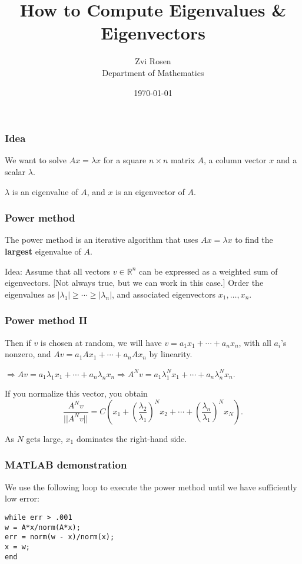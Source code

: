\documentclass[12pt]{beamer}
\newcommand{\RR}{\ensuremath{\mathbb{R}}}
\theoremstyle{definition}
\begin{document}
\author[Z. Rosen]{Zvi Rosen \\ Department of Mathematics}

\date[\today]{\today}
\title[Eigenvalue Algorithms]{{\Large How to Compute 
Eigenvalues \& Eigenvectors}}


\frame{\titlepage}


\begin{frame}
\frametitle{Idea}
We want to solve $Ax = \lambda x$ for a square $n \times n$ matrix $A$,
a column vector $x$ and a scalar $\lambda$.

$\lambda$ is an eigenvalue of $A$, and $x$ is an eigenvector of $A$.
\end{frame}

\begin{frame}
\frametitle{Power method}

The power method is an iterative algorithm that uses $Ax =  \lambda x$ to
find the {\bf largest} eigenvalue of $A$.

Idea: Assume that all vectors $v \in \RR^n$ can be expressed as
a weighted sum of eigenvectors. [Not always true, but we can work in this
case.] Order the eigenvalues as $|\lambda_1| \geq \cdots \geq |\lambda_n|$, and
associated eigenvectors $x_1,\ldots,x_n$.

\end{frame}

\begin{frame}

\frametitle{Power method II}
Then if $v$ is chosen at random, we will have 
$v = a_1 x_1 + \cdots + a_n x_n$, with all $a_i$'s nonzero,
and $Av =  a_1 A x_1 + \cdots + a_n A x_n$ by linearity.

$\Rightarrow Av = a_1 \lambda_1 x_1 + \cdots + a_n \lambda_n x_n
 \Rightarrow A^Nv = a_1 \lambda_1^N x_1 + \cdots + a_n \lambda_n^N x_n$.

If you normalize this vector, you obtain
\[\dfrac{A^Nv}{||A^Nv||} = C \left( x_1 + \left(\dfrac{\lambda_2}{\lambda_1}\right)^N x_2 + \cdots +  \left(\dfrac{\lambda_n}{\lambda_1}\right)^Nx_N\right).\]

As $N$ gets large, $x_1$ dominates the right-hand side.
\end{frame}

\begin{frame}
\frametitle{MATLAB demonstration}

We use the following loop to execute the power method until
we have sufficiently low error:

\vspace{1cm}

{\tt while err > .001 } \\
{\tt    w = A*x/norm(A*x);} \\
{\tt  err = norm(w - x)/norm(x);}\\
{\tt    x = w;}\\
{\tt end}

\end{frame}
\end{document}
